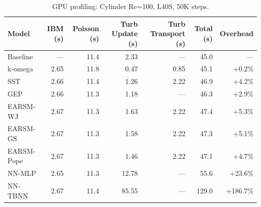 \begin{table}[htbp]
\centering
\caption{GPU profiling: Cylinder Re=100, L40S, 50K steps.}
\label{tab:gpu_profiling_cylinder}
\begin{tabular}{lrrrrrr}
\toprule
\textbf{Model} & \textbf{IBM (s)} & \textbf{Poisson (s)} & \textbf{Turb Update (s)} & \textbf{Turb Transport (s)} & \textbf{Total (s)} & \textbf{Overhead} \\
\midrule
Baseline & --- & 11.4 & 2.33 & --- & 45.0 & --- \\
k-omega & 2.65 & 11.8 & 0.47 & 0.85 & 45.1 & +0.2\% \\
SST & 2.66 & 11.4 & 1.26 & 2.22 & 46.9 & +4.2\% \\
GEP & 2.66 & 11.3 & 1.18 & --- & 46.3 & +2.9\% \\
EARSM-WJ & 2.67 & 11.3 & 1.63 & 2.22 & 47.4 & +5.3\% \\
EARSM-GS & 2.67 & 11.3 & 1.58 & 2.22 & 47.3 & +5.1\% \\
EARSM-Pope & 2.67 & 11.3 & 1.46 & 2.22 & 47.1 & +4.7\% \\
NN-MLP & 2.65 & 11.3 & 12.78 & --- & 55.6 & +23.6\% \\
NN-TBNN & 2.67 & 11.4 & 85.55 & --- & 129.0 & +186.7\% \\
\bottomrule
\end{tabular}
\end{table}
